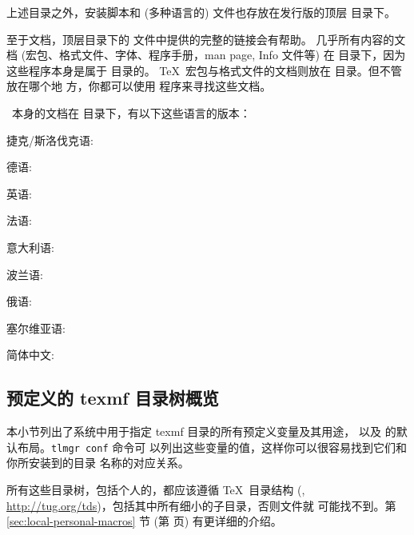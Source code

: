 \documentclass{article}
\begin{document}
上述目录之外，安装脚本和 (多种语言的)  文件也存放在发行版的顶层
目录下。

至于文档，顶层目录下的  文件中提供的完整的链接会有帮助。
几乎所有内容的文档 (宏包、格式文件、字体、程序手册，man page, Info 文件等) 在
 目录下，因为这些程序本身是属于  目录的。
\TeX\ 宏包与格式文件的文档则放在  目录。但不管放在哪个地
方，你都可以使用  程序来寻找这些文档。

\TL\ 本身的文档在  目录下，有以下这些语言的版本：

\begin{itemize*}
\item{捷克/斯洛伐克语:} 
\item{德语:} 
\item{英语:} 
\item{法语:} 
\item{意大利语:} 
\item{波兰语:} 
\item{俄语:} 
\item{塞尔维亚语:} 
\item{简体中文:} 
\end{itemize*}


\subsection{预定义的 texmf 目录树概览}
\label{sec:texmftrees}

本小节列出了系统中用于指定 texmf 目录的所有预定义变量及其用途，
以及 \TL{} 的默认布局。\texttt{tlmgr~conf} 命令可
以列出这些变量的值，这样你可以很容易找到它们和你所安装到的目录
名称的对应关系。

所有这些目录树，包括个人的，都应该遵循 \TeX\ 目录结构 (\TDS,
\url{http://tug.org/tds})，包括其中所有细小的子目录，否则文件就
可能找不到。第 \ref{sec:local-personal-macros} 节 (第
\pageref{sec:local-personal-macros} 页) 有更详细的介绍。
\end{document}
